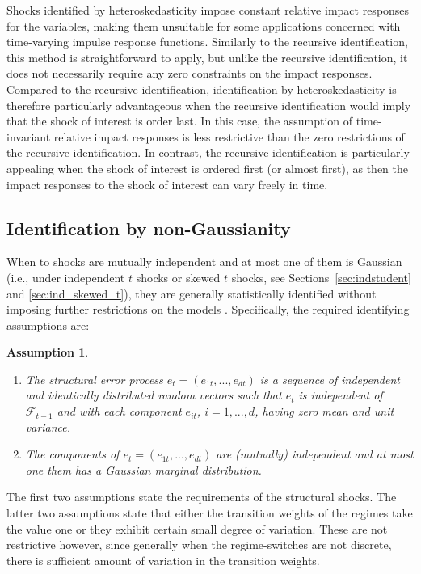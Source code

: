 \documentclass[nojss]{jss}
\newtheorem{assumption}{Assumption}
\begin{document}
Shocks identified by heteroskedasticity impose constant relative impact responses for the variables, making them unsuitable for some applications concerned with time-varying impulse response functions. Similarly to the recursive identification, this method is straightforward to apply, but unlike the recursive identification, it does not necessarily require any zero constraints on the impact responses. Compared to the recursive identification, identification by heteroskedasticity is therefore particularly advantageous when the recursive identification would imply that the shock of interest is order last. In this case, the assumption of time-invariant relative impact responses is less restrictive than the zero restrictions of the recursive identification. In contrast, the recursive identification is particularly appealing when the shock of interest is ordered first (or almost first), as then the impact responses to the shock of interest can vary freely in time.

\subsection{Identification by non-Gaussianity}\label{sec:ident_non_gauss}

When to shocks are mutually independent and at most one of them is Gaussian (i.e., under independent $t$ shocks or skewed $t$ shocks, see Sections~\ref{sec:indstudent} and \ref{sec:ind_skewed_t}), they are generally statistically identified without imposing further restrictions on the models \citep{Virolainen2:2024}. Specifically, the required identifying assumptions are:
\begin{assumption}\label{as:shocks}
\begin{enumerate}%
\item The structural error process $e_t=(e_{1t},...,e_{dt})$ is a sequence of independent and identically distributed random vectors such that $e_t$ is independent of $\mathcal{F}_{t-1}$ and with each component $e_{it}$, $i=1,...,d$, having zero mean and unit variance.
\item The components of $e_t=(e_{1t},...,e_{dt})$ are (mutually) independent and at most one them has a Gaussian marginal distribution.
\end{enumerate}
\end{assumption}
The first two assumptions state the requirements of the structural shocks. The latter two assumptions state that either the transition weights of the regimes take the value one or they exhibit certain small degree of variation. These are not restrictive however, since generally when the regime-switches are not discrete, there is sufficient amount of variation in the transition weights.
\end{document}
